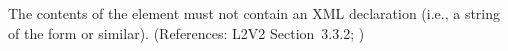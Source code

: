 The contents of the  element must not contain an XML
declaration (i.e., a string of the form  or similar).  (References: L2V2 Section~3.3.2;
)
